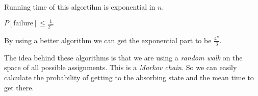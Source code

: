 Running time of this algortihm is exponential in $n$.

$P[\text{failure}] \leq \frac{1}{2^m}$

By using a better algorithm we can get the exponential part to be $\frac{4^n}{3}$.

The idea behind these algorithms is that we are using a \textit{random walk} on the space of all possible assignments. This is a \textit{Markov chain}. So we can easily calculate the probability of getting to the absorbing state and the mean time to get there.
